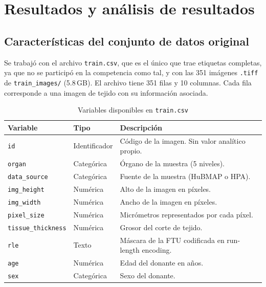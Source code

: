 \documentclass[11pt,letterpaper]{article}
\begin{document}
\section{Resultados y análisis de resultados}\label{sec:resultados}

\subsection{Características del conjunto de datos original}

Se trabajó con el archivo \texttt{train.csv}, que es el único que trae etiquetas completas, ya que no
se participó en la competencia como tal, y con las 351 imágenes \texttt{.tiff} de
\texttt{train\_images/} (5.8\,GB). El archivo tiene 351 filas y 10 columnas. Cada fila corresponde a
una imagen de tejido con su información asociada.

\begin{table}[H]
\centering
\caption{Variables disponibles en \texttt{train.csv}}
\begin{tabular}{llp{7.6cm}}
\toprule
\textbf{Variable} & \textbf{Tipo} & \textbf{Descripción} \\
\midrule
\texttt{id}               & Identificador & Código de la imagen. Sin valor analítico propio. \\
\texttt{organ}            & Categórica    & Órgano de la muestra (5 niveles). \\
\texttt{data\_source}     & Categórica    & Fuente de la muestra (HuBMAP o HPA). \\
\texttt{img\_height}      & Numérica      & Alto de la imagen en píxeles. \\
\texttt{img\_width}       & Numérica      & Ancho de la imagen en píxeles. \\
\texttt{pixel\_size}      & Numérica      & Micrómetros representados por cada píxel. \\
\texttt{tissue\_thickness}& Numérica      & Grosor del corte de tejido. \\
\texttt{rle}              & Texto         & Máscara de la FTU codificada en run-length encoding. \\
\texttt{age}              & Numérica      & Edad del donante en años. \\
\texttt{sex}              & Categórica    & Sexo del donante. \\
\bottomrule
\end{tabular}
\end{table}
\end{document}

